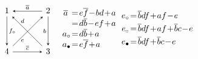 \documentclass[11pt, letterpaper]{amsart}
\theoremstyle{definition}
\numberwithin{equation}{section}
\def\nsquare{\scalebox{.85}{$\scriptscriptstyle\Box$}}
\begin{document}
\begin{figure}[ht]
\begin{equation*}
\begin{array}{ccccccccc}
\begin{tikzcd}[arrows={-stealth}, sep=\sepps]
  1  \arrow[r,  "\overline{a}", \snsl] \arrow[dr, "d" near start, outer sep=\outsepd, \snsl]  \arrow[d, "f_\circ", \snls]  
  & 2  \arrow[d, swap, "b", \snls] \arrow[dl, "e", near end, outer sep=\outsepe, \snsl]
  \\
   4 
   & 3  \arrow[l, "\overline{c}", swap, \snsl] 
\end{tikzcd}

 &\multicolumn{2}{c}{
 \begin{aligned}
 \overline{a}\,\,&\!=\! %
 e\overline{f}\!-\!bd\!+\!a\\[-3pt]
 &\!=\! d\overline{b}\!-\!ef\!+\!a \\[-3pt]
 a_\circ&\!=\! d\overline{b}\!+\!a \\[-3pt]
 a_\bullet&\!=\! e\overline{f}\!+\!a
 \end{aligned}
 }
& &\multicolumn{2}{c}{
\hspace{-15pt}
\begin{aligned}
 e_{\circ} &\!=\!  \overline{b}df  \!+\!af\!-\!e\\
 e_{\nsquare}%
 &\!=\! \overline{b}df\!+\!af\!+\!\overline{b}c\! -\! e\\
 e_\bullet &\!=\! \overline{b}df\!+\!\overline{b}c\! -\! e\\
 \end{aligned}
 }
 
&  
 

\end{array}
\end{equation*}
\end{figure}
\end{document}
